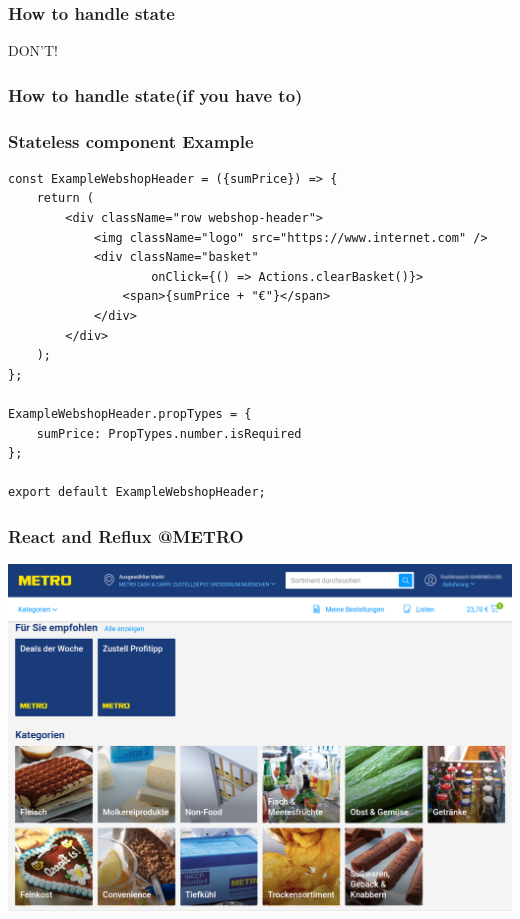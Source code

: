 \documentclass{beamer}
\begin{document}
\begin{frame}\frametitle{How to handle state}
\vspace*{\fill}
\begin{center}
\begin{minipage}{.6\textwidth}
DON'T!
\end{minipage}
\end{center}
\vfill %
\end{frame}

\begin{frame}\frametitle{How to handle state\newline(if you have to)}
\begin{itemize}
\end{itemize}
\end{frame}

\begin{frame}[fragile]\frametitle{Stateless component \textendash{} Example}
\begin{lstlisting}[style=htmlcssjs]
const ExampleWebshopHeader = ({sumPrice}) => {
    return (
        <div className="row webshop-header">
            <img className="logo" src="https://www.internet.com" />
            <div className="basket" 
                    onClick={() => Actions.clearBasket()}>
                <span>{sumPrice + "€"}</span>
            </div>
        </div>
    );
};

ExampleWebshopHeader.propTypes = {
    sumPrice: PropTypes.number.isRequired
};

export default ExampleWebshopHeader;
\end{lstlisting}
\end{frame}

\begin{frame}\frametitle{React and Reflux @METRO}
\centering
\includegraphics[width=.85\linewidth,height=.85\textheight,keepaspectratio]{pics/betty.png}
\end{frame}
\end{document}
